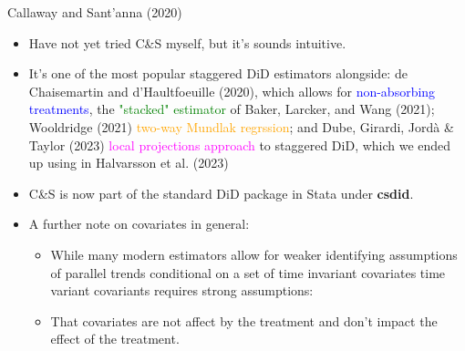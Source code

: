 \documentclass[notes,11pt, aspectratio=169]{beamer}
\begin{document}
\begin{frame}{Callaway and Sant'anna (2020)}
\begin{itemize}

\item Have not yet tried C\&S myself, but it's sounds intuitive. 
\item It's one of the most popular staggered DiD estimators alongside: de Chaisemartin and d'Haultfoeuille (2020), which allows for \textcolor{blue}{non-absorbing treatments}, the \textcolor{green}{"stacked" estimator} of Baker, Larcker, and Wang (2021); Wooldridge (2021) \textcolor{orange}{two-way Mundlak regrssion}; and  Dube, Girardi, Jordà \& Taylor (2023) \textcolor{magenta}{local projections approach} to staggered DiD, which we ended up using in Halvarsson et al. (2023) 

\item C\&S is now part of the standard DiD package in Stata under \textbf{csdid}.
\item A further note on covariates in general:
\begin{itemize}
    \item While many modern estimators allow for weaker identifying assumptions of parallel trends conditional on a set of time invariant covariates time variant covariants requires strong assumptions:
    \item That covariates are not affect by the treatment and don't impact the effect of the treatment. 
\end{itemize}
\end{itemize}
\end{frame}
\end{document}
